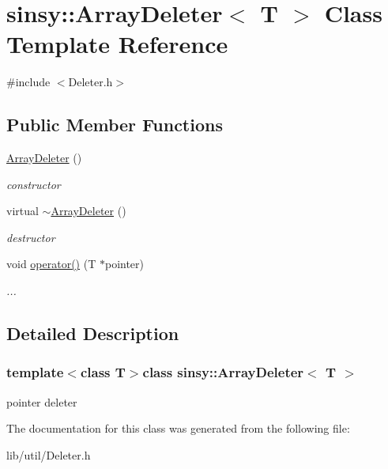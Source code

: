 \hypertarget{classsinsy_1_1ArrayDeleter}{\section{sinsy\-:\-:\-Array\-Deleter$<$ \-T $>$ \-Class \-Template \-Reference}
\label{classsinsy_1_1ArrayDeleter}
}


{\ttfamily \#include $<$\-Deleter.\-h$>$}

\subsection*{\-Public \-Member \-Functions}
\begin{DoxyCompactItemize}
\item 
\hypertarget{classsinsy_1_1ArrayDeleter_a5e1cf3dfe1db4530851d38fcff630f93}{\hyperlink{classsinsy_1_1ArrayDeleter_a5e1cf3dfe1db4530851d38fcff630f93}{\-Array\-Deleter} ()}\label{classsinsy_1_1ArrayDeleter_a5e1cf3dfe1db4530851d38fcff630f93}

\begin{DoxyCompactList}\small\item\em constructor \end{DoxyCompactList}\item 
\hypertarget{classsinsy_1_1ArrayDeleter_a16cd4fd1e0992d3cf39b061f822b79e1}{virtual \hyperlink{classsinsy_1_1ArrayDeleter_a16cd4fd1e0992d3cf39b061f822b79e1}{$\sim$\-Array\-Deleter} ()}\label{classsinsy_1_1ArrayDeleter_a16cd4fd1e0992d3cf39b061f822b79e1}

\begin{DoxyCompactList}\small\item\em destructor \end{DoxyCompactList}\item 
\hypertarget{classsinsy_1_1ArrayDeleter_a84b25c3870e417d2dae0023e4284a819}{void \hyperlink{classsinsy_1_1ArrayDeleter_a84b25c3870e417d2dae0023e4284a819}{operator()} (\-T $\ast$pointer)}\label{classsinsy_1_1ArrayDeleter_a84b25c3870e417d2dae0023e4284a819}

\begin{DoxyCompactList}\small\item\em ... \end{DoxyCompactList}\end{DoxyCompactItemize}


\subsection{\-Detailed \-Description}
\subsubsection*{template$<$class T$>$class sinsy\-::\-Array\-Deleter$<$ T $>$}

pointer deleter 

\-The documentation for this class was generated from the following file\-:\begin{DoxyCompactItemize}
\item 
lib/util/\-Deleter.\-h\end{DoxyCompactItemize}
